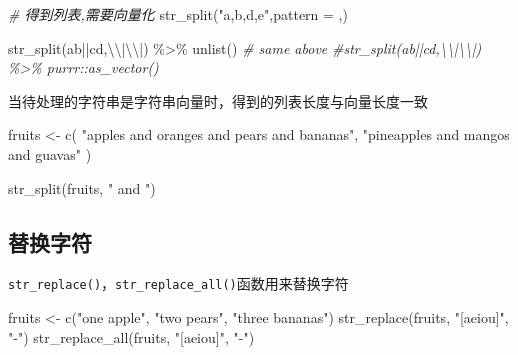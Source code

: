 \documentclass[
]{book}
\newenvironment{Shaded}{\begin{snugshade}}{\end{snugshade}}
\newcommand{\AttributeTok}[1]{\textcolor[rgb]{0.77,0.63,0.00}{#1}}
\newcommand{\CommentTok}[1]{\textcolor[rgb]{0.56,0.35,0.01}{\textit{#1}}}
\newcommand{\FunctionTok}[1]{\textcolor[rgb]{0.00,0.00,0.00}{#1}}
\newcommand{\NormalTok}[1]{#1}
\newcommand{\OtherTok}[1]{\textcolor[rgb]{0.56,0.35,0.01}{#1}}
\newcommand{\SpecialCharTok}[1]{\textcolor[rgb]{0.00,0.00,0.00}{#1}}
\newcommand{\StringTok}[1]{\textcolor[rgb]{0.31,0.60,0.02}{#1}}
\begin{document}
\begin{Shaded}
\begin{Highlighting}[]
\CommentTok{\# 得到列表,需要向量化}
\FunctionTok{str\_split}\NormalTok{(}\StringTok{"a,b,d,e"}\NormalTok{,}\AttributeTok{pattern =} \StringTok{\textquotesingle{},\textquotesingle{}}\NormalTok{)}

\FunctionTok{str\_split}\NormalTok{(}\StringTok{\textquotesingle{}ab||cd\textquotesingle{}}\NormalTok{,}\StringTok{\textquotesingle{}}\SpecialCharTok{\textbackslash{}\textbackslash{}}\StringTok{|}\SpecialCharTok{\textbackslash{}\textbackslash{}}\StringTok{|\textquotesingle{}}\NormalTok{) }\SpecialCharTok{\%\textgreater{}\%} \FunctionTok{unlist}\NormalTok{()}
\CommentTok{\# same above}
\CommentTok{\#str\_split(\textquotesingle{}ab||cd\textquotesingle{},\textquotesingle{}\textbackslash{}\textbackslash{}|\textbackslash{}\textbackslash{}|\textquotesingle{}) \%\textgreater{}\% purrr::as\_vector()}
\end{Highlighting}
\end{Shaded}

当待处理的字符串是字符串向量时，得到的列表长度与向量长度一致

\begin{Shaded}
\begin{Highlighting}[]
\NormalTok{fruits }\OtherTok{\textless{}{-}} \FunctionTok{c}\NormalTok{(}
  \StringTok{"apples and oranges and pears and bananas"}\NormalTok{,}
  \StringTok{"pineapples and mangos and guavas"}
\NormalTok{)}

\FunctionTok{str\_split}\NormalTok{(fruits, }\StringTok{" and "}\NormalTok{)}
\end{Highlighting}
\end{Shaded}

\hypertarget{ux66ffux6362ux5b57ux7b26}{%
\subsection{替换字符}\label{ux66ffux6362ux5b57ux7b26}}

\texttt{str\_replace()}，\texttt{str\_replace\_all()}函数用来替换字符

\begin{Shaded}
\begin{Highlighting}[]
\NormalTok{fruits }\OtherTok{\textless{}{-}} \FunctionTok{c}\NormalTok{(}\StringTok{"one apple"}\NormalTok{, }\StringTok{"two pears"}\NormalTok{, }\StringTok{"three bananas"}\NormalTok{)}
\FunctionTok{str\_replace}\NormalTok{(fruits, }\StringTok{"[aeiou]"}\NormalTok{, }\StringTok{"{-}"}\NormalTok{)}
\FunctionTok{str\_replace\_all}\NormalTok{(fruits, }\StringTok{"[aeiou]"}\NormalTok{, }\StringTok{"{-}"}\NormalTok{)}
\end{Highlighting}
\end{Shaded}
\end{document}
